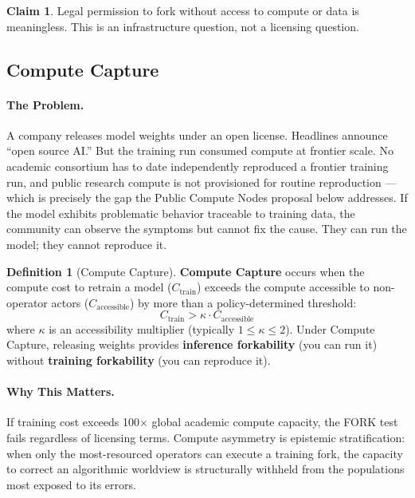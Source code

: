 \documentclass{article}
\theoremstyle{definition}
\newtheorem{definition}{Definition}[section]
\newtheorem{claim}{Claim}[section]
\begin{document}
\begin{claim}
Legal permission to fork without access to compute or data is meaningless. This is an infrastructure question, not a licensing question.
\end{claim}

\subsection{Compute Capture}
\label{subsec:compute-capture}

\paragraph{The Problem.} A company releases model weights under an open license. Headlines announce ``open source AI.'' But the training run consumed compute at frontier scale. No academic consortium has to date independently reproduced a frontier training run, and public research compute is not provisioned for routine reproduction --- which is precisely the gap the Public Compute Nodes proposal below addresses. If the model exhibits problematic behavior traceable to training data, the community can observe the symptoms but cannot fix the cause. They can run the model; they cannot reproduce it.

\begin{definition}[Compute Capture]
\label{def:compute-capture}
\textbf{Compute Capture} occurs when the compute cost to retrain a model ($C_{\text{train}}$) exceeds the compute accessible to non-operator actors ($C_{\text{accessible}}$) by more than a policy-determined threshold:
\begin{equation}
C_{\text{train}} > \kappa \cdot C_{\text{accessible}}
\end{equation}
where $\kappa$ is an accessibility multiplier (typically $1 \leq \kappa \leq 2$). Under Compute Capture, releasing weights provides \textbf{inference forkability} (you can run it) without \textbf{training forkability} (you can reproduce it).
\end{definition}

\paragraph{Why This Matters.} If training cost exceeds 100$\times$ global academic compute capacity, the FORK test fails regardless of licensing terms. Compute asymmetry is epistemic stratification: when only the most-resourced operators can execute a training fork, the capacity to correct an algorithmic worldview is structurally withheld from the populations most exposed to its errors.
\end{document}
